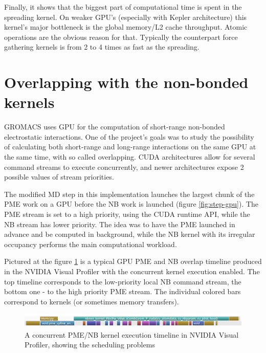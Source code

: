 \documentclass[12pt,a4paper]{report}
\begin{document}
Finally, it shows that the biggest part of computational time is spent in the spreading kernel. On weaker GPU's (especially with Kepler architecture) this kernel's major bottleneck is the global memory/L2 cache throughput. Atomic operations are the obvious reason for that. Typically the counterpart force gathering kernels is from 2 to 4 times as fast as the spreading. 

\FloatBarrier
\section{Overlapping with the non-bonded kernels}\label{overlapped}

GROMACS uses GPU for the computation of short-range non-bonded electrostatic interactions. One of the project's goals was to study the possibility of calculating both short-range and long-range interactions on the same GPU at the same time, with so called overlapping. CUDA architectures allow for several command streams to execute concurrently, and newer architectures expose 2 possible values of stream priorities.

The modified MD step in this implementation launches the largest chunk of the PME work on a GPU before the NB work is launched (figure \ref{fig:step-gpu}). The PME stream is set to a high priority, using the CUDA runtime API, while the NB stream has lower priority. 
The idea was to have the PME launched in advance and be computed in background, while the NB kernel with its irregular occupancy performs the main computational workload.

Pictured at the figure \ref{fig:overlap} is a typical GPU PME and NB overlap timeline produced in the NVIDIA Visual Profiler with the concurrent kernel execution enabled.
The top timeline corresponds to the low-priority local NB command stream, the bottom one - to the high priority PME stream. The individual colored bars correspond to kernels (or sometimes memory transfers). 

\FloatBarrier
\begin{figure} [h!]
    \centering
    \includegraphics[width=1\textwidth]{pics/overlap-crop.png}
    \caption{A concurrent PME/NB kernel execution timeline in NVIDIA Visual Profiler, showing the scheduling problems}
    \label{fig:overlap}
\end{figure}
\FloatBarrier
\end{document}
